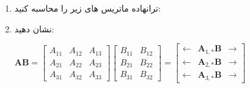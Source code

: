 {\begin{spacing}{1.5}
\begin{enumerate}[label=\textbf{\arabic*}.]
            \item {ترانهاده ماتریس های زیر را محاسبه کنید: \\
            }

            \item {نشان دهید: \\
                \begin{center}
                    $\textbf{AB}=\begin{bmatrix}
                                     A_{11} & A_{12} & A_{13} \\
                                     A_{21} & A_{22} & A_{23} \\
                                     A_{31} & A_{32} & A_{33}
                    \end{bmatrix}\begin{bmatrix}
                                     B_{11} & B_{12} \\
                                     B_{21} & B_{22} \\
                                     B_{31} & B_{32}
                    \end{bmatrix}=\begin{bmatrix}
                                      \leftarrow & \textbf{A}_{1,*}\textbf{B} & \rightarrow \\
                                      \leftarrow & \textbf{A}_{2,*}\textbf{B} & \rightarrow \\
                                      \leftarrow & \textbf{A}_{3,*}\textbf{B} & \rightarrow
                    \end{bmatrix}$
                \end{center}
            }


\end{enumerate}
\end{spacing}}
